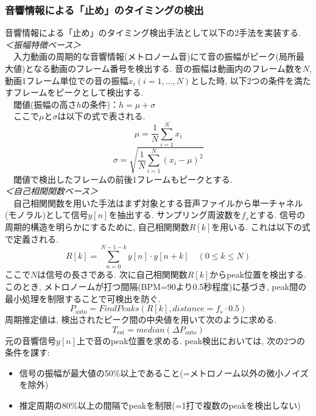 \documentclass[paper]{ieicej}
\begin{document}
\subsubsection{音響情報による「止め」のタイミングの検出}
音響情報による「止め」のタイミング検出手法として以下の2手法を実装する. \\
\textit{＜振幅特徴ベース＞}\\
　入力動画の周期的な音響情報(メトロノーム音)にて音の振幅がピーク(局所最大値)となる動画のフレーム番号を検出する. 音の振幅は動画内のフレーム数を$N$, 動画1フレーム単位での音の振幅$x_i(i=1,\dots,N)$とした時, 以下2つの条件を満たすフレームをピークとして検出する. \\
　閾値(振幅の高さ$h$の条件)：$h=\mu+\sigma$ \\
　ここで$\mu$と$\sigma$は以下の式で表される.
\begin{equation}
  \mu=\frac{1}{N}\sum_{i=1}^{N} x_{i}
\end{equation}
\begin{equation}
  \sigma=\sqrt{\frac{1}{N} \sum_{i=1}^{N}(x_{i}-\mu)^2}
\end{equation}
　閾値で検出したフレームの前後1フレームもピークとする. \\
\textit{＜自己相関関数ベース＞}\\
　自己相関関数を用いた手法はまず対象とする音声ファイルから単一チャネル(モノラル)として信号$y[n]$を抽出する. サンプリング周波数を$f_s$とする. 信号の周期的構造を明らかにするために, 自己相関関数$R[k]$を用いる. これは以下の式で定義される.
\begin{equation}
  R[k]=\sum_{n=0}^{N-1-k} y[n] \cdot y[n+k] \quad (0 \leq k \leq N)
\end{equation}
ここで$N$は信号の長さである. 次に自己相関関数$R[k]$からpeak位置を検出する. このとき, メトロノームが打つ間隔(BPM=90より0.5秒程度)に基づき, peak間の最小処理を制限することで可検出を防ぐ.
\begin{equation}
  P_{\mathrm{auto}}=FindPeaks(R[k],distance= f_{s}\cdot0.5)
\end{equation} 
周期推定値は, 検出されたピーク間の中央値を用いて次のように求める. 
\begin{equation}
  T_{\mathrm{est}}=median(\Delta P_{\mathrm{auto}})
\end{equation} 
元の音響信号$y[n]$上で音のpeak位置を求める. peak検出においては, 次の2つの条件を課す:
\begin{itemize}[nosep]
  \item 信号の振幅が最大値の50\%以上であること(=メトロノーム以外の微小ノイズを除外)
  \item 推定周期の80\%以上の間隔でpeakを制限(=1打で複数のpeakを検出しない)
\end{itemize}
\end{document}
